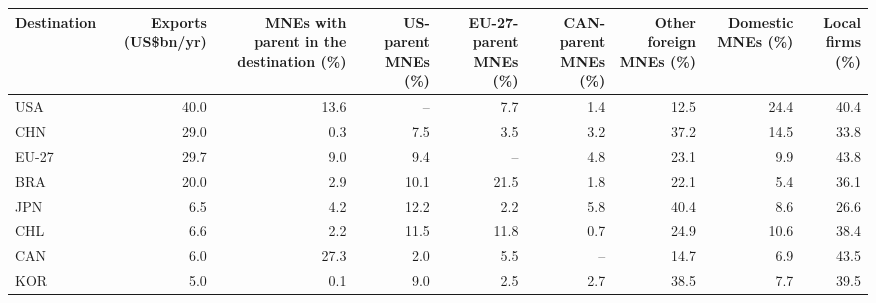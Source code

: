 \begin{tabular}{lrrrrrrrr}
\toprule
Destination & \multicolumn{1}{p{1.5cm}}{\raggedright Exports (US\$bn/yr)} & \multicolumn{1}{p{2.2cm}}{\raggedright MNEs with parent in the destination (\%)} & \multicolumn{1}{p{1.6cm}}{\raggedright US-parent MNEs (\%)} & \multicolumn{1}{p{1.6cm}}{\raggedright EU-27-parent MNEs (\%)} & \multicolumn{1}{p{1.6cm}}{\raggedright CAN-parent MNEs (\%)} & \multicolumn{1}{p{1.6cm}}{\raggedright Other foreign MNEs (\%)} & \multicolumn{1}{p{1.6cm}}{\raggedright Domestic MNEs (\%)} & \multicolumn{1}{p{1.5cm}}{\raggedright Local firms (\%)} \\
\midrule
USA & 40.0 & 13.6 & -- & 7.7 & 1.4 & 12.5 & 24.4 & 40.4 \\
CHN & 29.0 & 0.3 & 7.5 & 3.5 & 3.2 & 37.2 & 14.5 & 33.8 \\
EU-27 & 29.7 & 9.0 & 9.4 & -- & 4.8 & 23.1 & 9.9 & 43.8 \\
BRA & 20.0 & 2.9 & 10.1 & 21.5 & 1.8 & 22.1 & 5.4 & 36.1 \\
JPN & 6.5 & 4.2 & 12.2 & 2.2 & 5.8 & 40.4 & 8.6 & 26.6 \\
CHL & 6.6 & 2.2 & 11.5 & 11.8 & 0.7 & 24.9 & 10.6 & 38.4 \\
CAN & 6.0 & 27.3 & 2.0 & 5.5 & -- & 14.7 & 6.9 & 43.5 \\
KOR & 5.0 & 0.1 & 9.0 & 2.5 & 2.7 & 38.5 & 7.7 & 39.5 \\
\bottomrule
\end{tabular}
